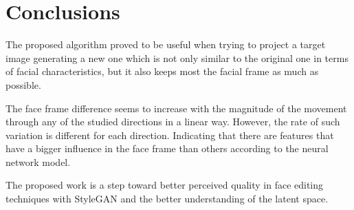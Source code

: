 \documentclass[review]{elsarticle}
\begin{document}
\section{Conclusions}\label{section:conclusions}

The proposed algorithm proved to be useful when trying to project a target image generating a new one which is not only similar to the original one in terms of facial characteristics, but it also keeps most the facial frame as much as possible.

The face frame difference seems to increase with the magnitude of the movement through any of the studied directions in a linear way. However, the rate of such variation is different for each direction. Indicating that there are features that have a bigger influence in the face frame than others according to the neural network model.

The proposed work is a step toward better perceived quality in face editing techniques with StyleGAN and the better understanding of the latent space.


\end{document}
